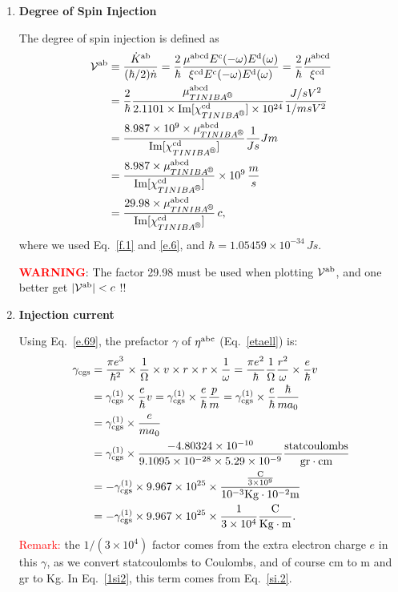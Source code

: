 \documentclass[12pt]{article}
\numberwithin{equation}{section}
\begin{document}
\begin{enumerate}
\item {\bf Degree of Spin Injection}

The degree of spin injection is defined as 
\begin{align}\label{eez.1}
\calv^{\rma\rmb}&\equiv\frac{\dot K^{\rma\rmb}}{(\hbar/2)\dot n}
=\frac{2}{\hbar}\frac{\mu^{\rma\rmb\rmc\rmd}E^\rmc(-\go)E^\rmd(\go)}
{\xi^{\rmc\rmd}E^\rmc(-\go)E^\rmd(\go)}
=\frac{2}{\hbar}\frac{\mu^{\rma\rmb\rmc\rmd}}
{\xi^{\rmc\rmd}}
\nonumber\\
&=
\frac{2}{\hbar}\frac{\mu^{\rma\rmb\rmc\rmd}_{\tiniba}}
{2.1101\times\mathrm{Im}[\chi^{\rmc\rmd}_{\tiniba}]\times 10^{24}}
\frac{J/sV^2}{1/msV^2}
\nonumber\\
&=
\frac{8.987\times 10^{9}\times\mu^{\rma\rmb\rmc\rmd}_{\tiniba}}
{\mathrm{Im}[\chi^{\rmc\rmd}_{\tiniba}]}
\frac{1}{Js}Jm 
\nonumber\\
&=
\frac{8.987\times \mu^{\rma\rmb\rmc\rmd}_{\tiniba}}
{\mathrm{Im}[\chi^{\rmc\rmd}_{\tiniba}]}
\times 10^9\,\frac{m}{s}
\nonumber\\
&=
\frac{29.98\times \mu^{\rma\rmb\rmc\rmd}_{\tiniba}}
{\mathrm{Im}[\chi^{\rmc\rmd}_{\tiniba}]}
\,c
,
\end{align} 
where we used Eq.~\eqref{f.1} and \eqref{e.6}, and 
$\hbar=1.05459\times 10^{-34}\,Js$. 

\textcolor{red}{\bf WARNING}: 
The factor 29.98 must be used when plotting ${\cal V}^{\mathrm{a}\mathrm{b}}$, and
one better get $|{\cal V}^{\mathrm{a}\mathrm{b}}|<c$ !!

\item  {\bf Injection current} 

Using Eq.~\eqref{e.69}, the prefactor $\gamma$ of 
$\eta^{\mathrm{a}\mathrm{b}\mathrm{c}}$ (Eq.~\eqref{etaell}) is:
\begin{align}\label{unp}
\gamma_{\mathrm{cgs}}
&=\frac{\pi e^3}{\hbar^2}\times\frac{1}{\Omega}\times v \times  
r\times r \times \frac{1}{\omega}
=\frac{\pi e^2}{\hbar}\frac{1}{\Omega}\frac{r^2}{\omega}\times\frac{e}{\hbar} v 
\nonumber\\
&=
\gamma^{(1)}_{\mathrm{cgs}}\times\frac{e}{\hbar} v 
=
\gamma^{(1)}_{\mathrm{cgs}}\times\frac{e}{\hbar}\frac{p}{m} 
=
\gamma^{(1)}_{\mathrm{cgs}}\times\frac{e}{\hbar}\frac{\hbar}{ma_0} 
\nonumber\\
&=
\gamma^{(1)}_{\mathrm{cgs}}\times\frac{e}{ma_0} 
\nonumber\\
&=
\gamma^{(1)}_{\mathrm{cgs}}\times 
\frac{-4.80324\times 10^{-10}}{9.1095\times 10^{-28}\times 5.29\times 
  10^{-9}} 
\frac{\mathrm{statcoulombs}}{\mathrm{gr}\cdot\mathrm{cm}}
\nonumber\\
&=-
\gamma^{(1)}_{\mathrm{cgs}}\times 
9.967\times 10^{25}\times 
\frac{\frac{\mathrm{C}}{3\times 10^9}}{10^{-3}\mathrm{Kg}\cdot 10^{-2}\mathrm{m}}
\nonumber\\
&=-
\gamma^{(1)}_{\mathrm{cgs}}
\times 
9.967\times 10^{25}\times 
\frac{1}{3\times 10^{4}}
\frac{\mathrm{C}}{\mathrm{Kg}\cdot\mathrm{m}}
.
\end{align}
\textcolor{red}{Remark:} the $1/(3\times 10^4)$ factor 
comes from the extra electron charge $e$ in 
this $\gamma$, as we convert statcoulombs to Coulombs, and of course
cm to m and gr to Kg. In 
Eq.~\eqref{1si2}, this term comes from
Eq.~\eqref{si.2}.


\end{enumerate}
\end{document}
